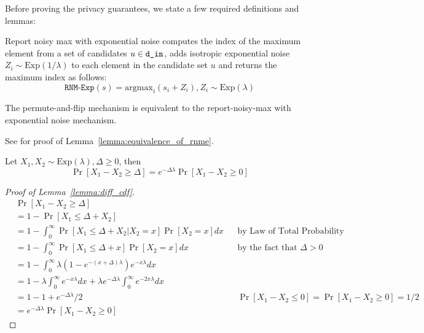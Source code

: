 \documentclass{article}
\begin{document}
Before proving the privacy guarantees, we state a few required definitions and lemmas:
\begin{definition}
    \label{definition:rnm-exp}
    Report noisy max with exponential noise computes the index of the maximum element from a set of candidates $u \in \texttt{d\_in} $, 
    adds isotropic exponential noise $Z_i \sim \mathrm{Exp}(1/\lambda)$ to each element in the candidate set $u$ and returns the maximum index as follows:
    \begin{equation}
        \texttt{RNM-Exp}(s) = \mathrm{argmax}_i(s_i + Z_i), Z_i \sim \mathrm{Exp}(\lambda)
    \end{equation} 
\end{definition}

\begin{lemma}
    \label{lemma:equivalence_of_rnme}
    The permute-and-flip mechanism is equivalent to the report-noisy-max with exponential noise mechanism. 
\end{lemma}
See \cite{ding2021permute} for proof of Lemma~\ref{lemma:equivalence_of_rnme}.


\begin{lemma}
    \label{lemma:diff_cdf}
    Let $X_1, X_2 \sim \mathrm{Exp}(\lambda), \Delta \geq 0$, then 
    \begin{equation}
        \Pr[X_1 - X_2 \geq \Delta] = e^{-\Delta\lambda} \Pr[X_1 - X_2 \geq 0]  
    \end{equation}
\end{lemma}

\begin{proof}[Proof of Lemma~\ref{lemma:diff_cdf}]
    \begin{align}
    & \Pr[X_1 - X_2 \geq \Delta] \\
    & = 1 - \Pr[X_1 \leq \Delta + X_2] \\
    & = 1 - \int^\infty_0 \Pr[X_1 \leq \Delta + X_2 | X_2 = x] \Pr[X_2 = x] dx && \text{by Law of Total Probability} \\
    & = 1 - \int^\infty_0 \Pr[X_1 \leq \Delta + x] \Pr[X_2 = x] dx  && \text{by the fact that } \Delta > 0 \\
    & = 1 - \int^\infty_0 \lambda(1 - e^{-(x + \Delta)\lambda})e^{-x\lambda}dx  \\
    & = 1 - \lambda \int^\infty_0 e^{-x\lambda} dx + \lambda e^{-\Delta\lambda} \int_0^\infty e^{-2x\lambda}dx \\
    & = 1 - 1 + e^{-\Delta\lambda} / 2 && \text{$\Pr[X_1 - X_2 \leq 0] = \Pr[X_1 - X_2 \geq 0] = 1/2$} \\
    & = e ^{-\Delta\lambda} \Pr[X_1 - X_2 \geq 0] 
    \end{align}
\end{proof}
\end{document}
